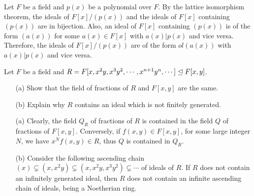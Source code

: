 \begin{cor}
    Let $F$ be a field and $p(x)$ be a polynomial over $F$.
    By the lattice isomorphism theorem, the ideals of $F[x]/(p(x))$ and the ideals of $F[x]$ containing $(p(x))$ are in bijection.
    Also, an ideal of $F[x]$ containing $(p(x))$ is of the form $(a(x))$ for some $a(x)\in F[x]$ with $a(x)|p(x)$ and vice versa.
    Therefore, the ideals of $F[x]/(p(x))$ are of the form $ol{(a(x))}$ with $a(x)|p(x)$ and vice versa.
\end{cor}

\begin{prob}
    Let $F$ be a field and $R=F[x, x^2y, x^3y^2, \cdots, x^{n+1}y^n, \cdots]\trianglelefteq F[x, y]$.
    \begin{enumerate}
        \item[(a)]
        {
            Show that the field of fractions of $R$ and $F[x, y]$ are the same. 
        }
        \item[(b)]
        {
            Explain why $R$ contains an ideal which is not finitely generated.
        }
    \end{enumerate}
\end{prob}
\begin{sol}
    \begin{enumerate}
        \item[(a)]
        {
            Clearly, the field $Q_R$ of fractions of $R$ is contained in the field $Q$ of fractions of $F[x, y]$.
            Conversely, if $f(x, y)\in F[x, y]$, for some large integer $N$, we have $x^Nf(x, y)\in R$, thus $Q$ is contained in $Q_R$.
        }
        \item[(b)]
        {
            Consider the following ascending chain $(x)\subsetneq (x, x^2y)\subsetneq (x, x^2y, x^3y^2)\subsetneq\cdots$ of ideals of $R$.
            If $R$ does not contain an infinitely generated ideal, then $R$ does not contain an infinite ascending chain of ideals, being a Noetherian ring.
        }
    \end{enumerate}
\end{sol}

